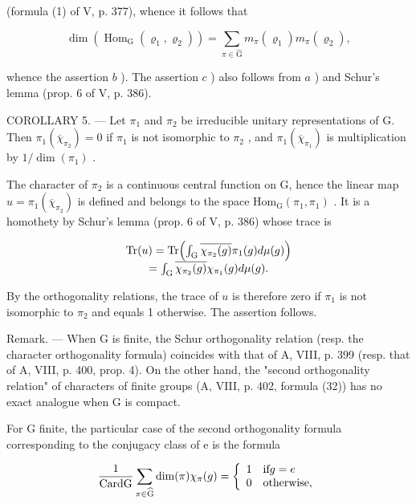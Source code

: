 (formula (1) of V, p. 377), whence it follows that

\[
\dim (\operatorname{Hom} _ {\mathrm{G}} (\varrho_ {1}, \varrho_ {2})) = \sum_ {\pi \in \widehat {\mathrm{G}}} m _ {\pi} (\varrho_ {1}) m _ {\pi} (\varrho_ {2}),
\]

whence the assertion \(b\) ). The assertion \(c\) ) also follows from \(a\) ) and Schur's lemma (prop. 6 of V, p. 386).

COROLLARY 5. --- Let \(\pi_1\) and \(\pi_2\) be irreducible unitary representations of G. Then \(\pi_1(\overline{\chi}_{\pi_2}) = 0\) if \(\pi_1\) is not isomorphic to \(\pi_2\) , and \(\pi_1(\overline{\chi}_{\pi_1})\) is multiplication by \(1/\dim(\pi_1)\) .

The character of \(\pi_2\) is a continuous central function on G, hence the linear map \(u = \pi_1(\overline{\chi}_{\pi_2})\) is defined and belongs to the space \(\mathrm{Hom}_{\mathrm{G}}(\pi_1,\pi_1)\) . It is a homothety by Schur's lemma (prop. 6 of V, p. 386) whose trace is

\[
\begin{array}{c} \operatorname{Tr} (u) = \operatorname{Tr} \Bigl (\int_ {\mathrm{G}} \overline {{\chi_ {\pi_ {2}} (g)}}   \pi_ {1} (g) d \mu (g) \Bigr) \\ = \int_ {\mathrm{G}} \overline {{\chi_ {\pi_ {2}} (g)}} \chi_ {\pi_ {1}} (g) d \mu (g). \end{array}
\]

By the orthogonality relations, the trace of \(u\) is therefore zero if \(\pi_1\) is not isomorphic to \(\pi_2\) and equals 1 otherwise. The assertion follows.

Remark. --- When G is finite, the Schur orthogonality relation (resp. the character orthogonality formula) coincides with that of A, VIII, p. 399 (resp. that of A, VIII, p. 400, prop. 4). On the other hand, the "second orthogonality relation" of characters of finite groups (A, VIII, p. 402, formula (32)) has no exact analogue when G is compact.

For G finite, the particular case of the second orthogonality formula corresponding to the conjugacy class of e is the formula

\[
\frac {1}{\mathrm{CardG}} \sum_ {\pi \in \widehat {\mathrm{G}}} \dim (\pi) \chi _ {\pi} (g) = \left\{ \begin{array}{l l} 1 & \text {if} g = e \\ 0 & \text {otherwise}, \end{array} \right.
\]

